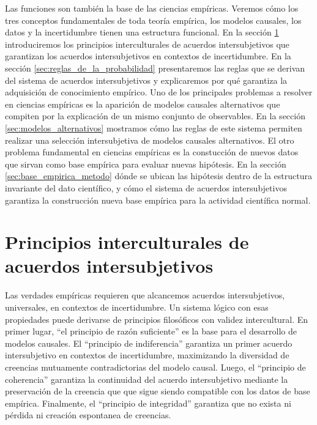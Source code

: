 \documentclass[a4paper,10pt]{book}
\theoremstyle{definition}
\begin{document}

Las funciones son también la base de las ciencias empíricas.
%
Veremos cómo los tres conceptos fundamentales de toda teoría empírica, los modelos causales, los datos y la incertidumbre tienen una estructura funcional.
%
En la sección \ref{sec:principios_interculturales} introduciremos los principios interculturales de acuerdos intersubjetivos
que garantizan los acuerdos intersubjetivos en contextos de incertidumbre.
%
En la sección \ref{sec:reglas_de_la_probabilidad} presentaremos las reglas que se derivan del sistema de acuerdos intersubjetivos y explicaremos por qué garantiza la adquisición de conocimiento empírico.
%
Uno de los principales problemas a resolver en ciencias empíricas es la aparición de modelos causales alternativos que compiten por la explicación de un mismo conjunto de observables.
%
En la sección \ref{sec:modelos_alternativos} mostramos cómo las reglas de este sistema permiten realizar una selección intersubjetiva de modelos causales alternativos.
%
El otro problema fundamental en ciencias empíricas es la constucción de nuevos datos que sirvan como base empírica para evaluar nuevas hipótesis.
%
En la sección \ref{sec:base_empirica_metodo} dónde se ubican las hipótesis dentro de la estructura invariante del dato científico, y cómo el sistema de acuerdos intersubjetivos garantiza la construcción nueva base empírica para la actividad científica normal.

\section{Principios interculturales de acuerdos intersubjetivos}\label{sec:principios_interculturales}

Las verdades empíricas requieren que alcancemos acuerdos intersubjetivos, universales, en contextos de incertidumbre.
%
Un sistema lógico con esas propiedades puede derivarse de principios filosóficos con validez intercultural.
%
En primer lugar, ``el principio de razón suficiente'' es la base para el desarrollo de modelos causales.
%
El ``principio de indiferencia'' garantiza un primer acuerdo intersubjetivo en contextos de incertidumbre, maximizando la diversidad de creencias mutuamente contradictorias del modelo causal.
%
Luego, el ``principio de coherencia'' garantiza la continuidad del acuerdo intersubjetivo mediante la preservación de la creencia que que sigue siendo compatible con los datos de base empírica.
%
Finalmente, el ``principio de integridad'' garantiza que no exista ni pérdida ni creación espontanea de creencias.
\end{document}
